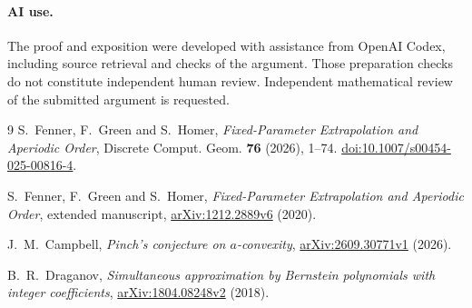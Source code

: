 \documentclass[11pt]{article}
\begin{document}
\paragraph{AI use.}
The proof and exposition were developed with assistance from OpenAI Codex,
including source retrieval and checks of the argument. Those preparation
checks do not constitute independent human review. Independent mathematical
review of the submitted argument is requested.

\begin{thebibliography}{9}
S.~Fenner, F.~Green and S.~Homer,
\emph{Fixed-Parameter Extrapolation and Aperiodic Order},
Discrete Comput. Geom. \textbf{76} (2026), 1--74.
\href{https://doi.org/10.1007/s00454-025-00816-4}{doi:10.1007/s00454-025-00816-4}.

S.~Fenner, F.~Green and S.~Homer,
\emph{Fixed-Parameter Extrapolation and Aperiodic Order}, extended manuscript,
\href{https://arxiv.org/abs/1212.2889v6}{arXiv:1212.2889v6} (2020).

J.~M.~Campbell, \emph{Pinch's conjecture on $a$-convexity},
\href{https://arxiv.org/abs/2609.30771v1}{arXiv:2609.30771v1} (2026).

B.~R.~Draganov,
\emph{Simultaneous approximation by Bernstein polynomials with integer coefficients},
\href{https://arxiv.org/abs/1804.08248v2}{arXiv:1804.08248v2} (2018).
\end{thebibliography}
\end{document}
